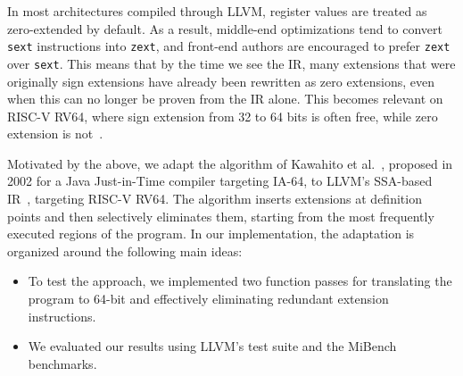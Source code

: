 In most architectures compiled through LLVM, register values are treated as zero-extended by default. As a result, middle-end optimizations 
tend to convert \texttt{sext} instructions into \texttt{zext}, and front-end authors are encouraged to prefer \texttt{zext} over \texttt{sext}. 
This means that by the time we see the IR, many extensions that were originally sign extensions have already been rewritten as zero extensions, 
even when this can no longer be proven from the IR alone. This becomes relevant on RISC-V RV64, where sign extension from 32 to 64 bits is often free, 
while zero extension is not~\cite{karouzakis2025llvm,riscv-isa}.



Motivated by the above, we adapt the algorithm of Kawahito et al.~\cite{kawahito2002effective}, proposed in 2002 for a Java Just-in-Time compiler targeting IA-64, to LLVM's SSA-based IR~\cite{llvm-langref}, targeting RISC-V RV64.
The algorithm inserts extensions at definition points and then selectively eliminates them, starting from the most frequently executed regions of the program. In our implementation, the adaptation is organized around the following main ideas:

\begin{itemize}
\item[--] To test the approach, we implemented two function passes for translating the program to 64-bit and effectively eliminating redundant extension instructions.
\item[--] We evaluated our results using LLVM's test suite and the MiBench benchmarks.
\end{itemize}

